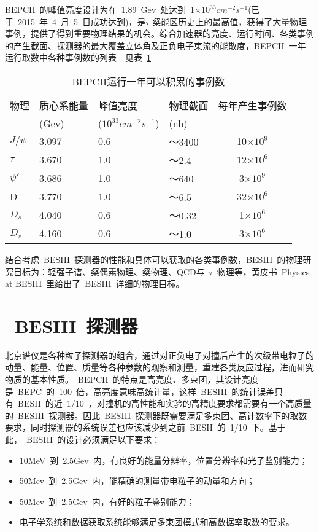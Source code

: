 BEPCII~的峰值亮度设计为在~1.89~Gev~处达到~1$\times$$10^{33}$$cm^{-2}$$s^{-1}$(已于~2015~年~4~月~5~日成功达到)，是$\tau$-粲能区历史上的最高值，获得了大量物理事例，提供了得到重要物理结果的机会。综合加速器的亮度、运行时间、各类事例的产生截面、探测器的最大覆盖立体角及正负电子束流的能散度，BEPCII~一年运行取数中各种事例数的列表~\cite{yuancz:2002}~见表~\ref{tbl:event-Number}~

\begin{table}[h]
    \centering
    \caption{\label{tbl:event-Number} BEPCII运行一年可以积累的事例数}
    \footnotesize
    \begin{tabular}{llllc}
        \hline
        物理& 质心系能量& 峰值亮度& 物理截面& 每年产生事例数 \\
             &(Gev)      &($10^{33} $$cm^{-2}$$s^{-1}$)& (nb)\\
        \hline
        $J/\psi$& 3.097& 0.6& ～3400&  10$\times$$10^{9}$ \\
        $\tau$&   3.670& 1.0& ～2.4&    12$\times$$10^{6}$ \\
        $\psi'$&  3.686& 1.0& ～640&    3$\times$$10^{9}$\\
        D&        3.770& 1.0& ～6.5&    32$\times$$10^{6}$\\
        $D_{s}$&   4.040& 0.6& ～0.32&   1$\times$$10^{6}$\\
        $D_{s}$&   4.160& 0.6& ～1.0&    3$\times$$10^{6}$\\
        \hline
    \end{tabular}
\end{table}

结合考虑~BESIII~探测器的性能和具体可以获取的各类事例数，BESIII~的物理研究目标为：轻强子谱、粲偶素物理、粲物理、QCD与~$\tau$~物理等，黄皮书~Physics at BESIII~里给出了~BESIII~详细的物理目标。~\cite{chaokt:2009}~\cite{wangyf2011}~

\section{~BESIII~探测器}
北京谱仪是各种粒子探测器的组合，通过对正负电子对撞后产生的次级带电粒子的动量、能量、位置、质量等各种参数的观察和测量，重建各类反应过程，进而研究物质的基本性质。~BEPCII~的特点是高亮度、多束团，其设计亮度是~BEPC~的~100~倍，高亮度意味高统计量，这样~BESIII~的统计误差只有~BESII~的近~1/10~，对撞机的高性能和实验的高精度要求都需要有一个高质量的~BESIII~探测器。因此~BESIII~探测器既需要满足多束团、高计数率下的取数要求，同时探测器的系统误差也应该减少到之前~BESII~的~1/10~下。基于此，~BESIII~的设计必须满足以下要求：
\begin{itemize}
\item{10MeV~到~2.5Gev~内，有良好的能量分辨率，位置分辨率和光子鉴别能力；}
\item{50Mev~到~2.5Gev~内，能精确的测量带电粒子的动量和方向；}
\item{50Mev~到~2.5Gev~内，有好的粒子鉴别能力；}
\item{电子学系统和数据获取系统能够满足多束团模式和高数据率取数的要求。}
\end{itemize}

